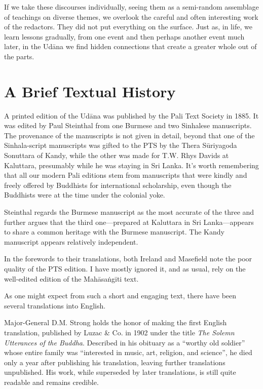 \documentclass[12pt,openany]{book}%
\begin{document}
If we take these discourses individually, seeing them as a semi-random assemblage of teachings on diverse themes, we overlook the careful and often interesting work of the redactors. They did not put everything on the surface. Just as, in life, we learn lessons gradually, from one event and then perhaps another event much later, in the \textsanskrit{Udāna} we find hidden connections that create a greater whole out of the parts.

\section*{A Brief Textual History}

A printed edition of the \textsanskrit{Udāna} was published by the Pali Text Society in 1885. It was edited by Paul Steinthal from one Burmese and two Sinhalese manuscripts. The provenance of the manuscripts is not given in detail, beyond that one of the Sinhala-script manuscripts was gifted to the PTS by the Thera \textsanskrit{Sūriyagoda} Sonuttara of Kandy, while the other was made for T.W. Rhys Davids at Kaluttara, presumably while he was staying in Sri Lanka. It’s worth remembering that all our modern Pali editions stem from manuscripts that were kindly and freely offered by Buddhists for international scholarship, even though the Buddhists were at the time under the colonial yoke. 

Steinthal regards the Burmese manuscript as the most accurate of the three and further argues that the third one—prepared at Kaluttara in Sri Lanka—appears to share a common heritage with the Burmese manuscript. The Kandy manuscript appears relatively independent.

In the forewords to their translations, both Ireland and Masefield note the poor quality of the PTS edition. I have mostly ignored it, and as usual, rely on the well-edited edition of the \textsanskrit{Mahāsaṅgīti} text.

As one might expect from such a short and engaging text, there have been several translations into English. 

Major-General D.M. Strong holds the honor of making the first English translation, published by Luzac \& Co. in 1902 under the title \textit{The Solemn Utterances of the Buddha}. Described in his obituary as a “worthy old soldier” whose entire family was “interested in music, art, religion, and science”, he died only a year after publishing his translation, leaving further translations unpublished. His work, while superseded by later translations, is still quite readable and remains credible.
\end{document}
